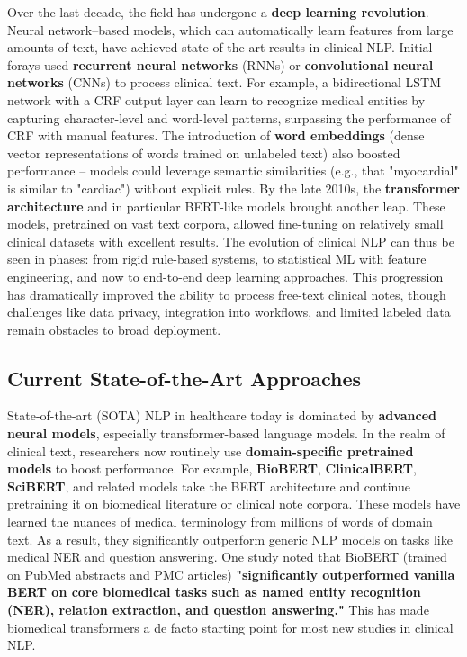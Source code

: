 Over the last decade, the field has undergone a \textbf{deep learning revolution}. Neural network–based models, which can automatically learn features from large amounts of text, have achieved state-of-the-art results in clinical NLP. Initial forays used \textbf{recurrent neural networks} (RNNs) or \textbf{convolutional neural networks} (CNNs) to process clinical text. For example, a bidirectional LSTM network with a CRF output layer can learn to recognize medical entities by capturing character-level and word-level patterns, surpassing the performance of CRF with manual features. The introduction of \textbf{word embeddings} (dense vector representations of words trained on unlabeled text) also boosted performance – models could leverage semantic similarities (e.g., that "myocardial" is similar to "cardiac") without explicit rules. By the late 2010s, the \textbf{transformer architecture} and in particular BERT-like models brought another leap. These models, pretrained on vast text corpora, allowed fine-tuning on relatively small clinical datasets with excellent results. The evolution of clinical NLP can thus be seen in phases: from rigid rule-based systems, to statistical ML with feature engineering, and now to end-to-end deep learning approaches. This progression has dramatically improved the ability to process free-text clinical notes, though challenges like data privacy, integration into workflows, and limited labeled data remain obstacles to broad deployment.

\subsection{Current State-of-the-Art Approaches}

State-of-the-art (SOTA) NLP in healthcare today is dominated by \textbf{advanced neural models}, especially transformer-based language models. In the realm of clinical text, researchers now routinely use \textbf{domain-specific pretrained models} to boost performance. For example, \textbf{BioBERT}, \textbf{ClinicalBERT}, \textbf{SciBERT}, and related models take the BERT architecture and continue pretraining it on biomedical literature or clinical note corpora. These models have learned the nuances of medical terminology from millions of words of domain text. As a result, they significantly outperform generic NLP models on tasks like medical NER and question answering. One study noted that BioBERT (trained on PubMed abstracts and PMC articles) \textbf{"significantly outperformed vanilla BERT on core biomedical tasks such as named entity recognition (NER), relation extraction, and question answering."} This has made biomedical transformers a de facto starting point for most new studies in clinical NLP.


